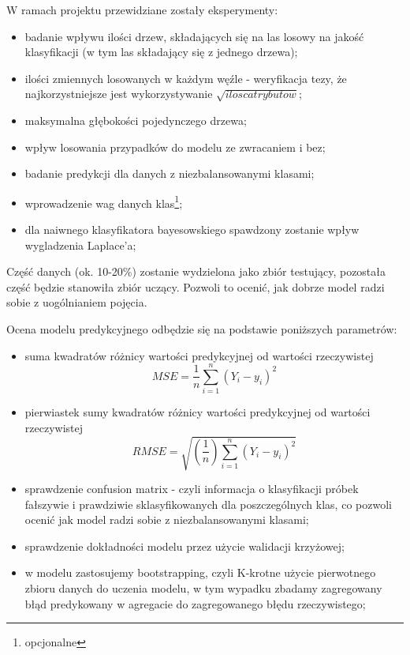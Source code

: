 
W ramach projektu przewidziane zostały eksperymenty:
\begin{itemize}
    \item badanie wpływu ilości drzew, składających się na las losowy na jakość klasyfikacji (w tym las składający się z jednego drzewa);
    \item ilości zmiennych losowanych w każdym węźle - weryfikacja tezy, że najkorzystniejsze jest wykorzystywanie $\sqrt {ilosc atrybutow}$;
    \item maksymalna głębokości pojedynczego drzewa;
    \item wpływ losowania przypadków do modelu ze zwracaniem i bez;
    \item badanie predykcji dla danych z niezbalansowanymi klasami;
        \item wprowadzenie wag danych klas\footnote[*]{opcjonalne};
        \item dla naiwnego klasyfikatora bayesowskiego spawdzony zostanie wpływ wygladzenia Laplace'a;
        
\end{itemize}

Część danych (ok. 10-20\%) zostanie wydzielona jako zbiór testujący, pozostała część będzie stanowiła zbiór uczący. Pozwoli to ocenić, jak dobrze model radzi sobie z uogólnianiem pojęcia. 

Ocena modelu predykcyjnego odbędzie się na podstawie poniższych parametrów:
\begin{itemize}
    \item suma kwadratów różnicy wartości predykcyjnej od wartości rzeczywistej
    \begin{equation}
    MSE = {\frac{1}{n}\sum_{i=1}^{n}(Y_{i} - y_{i})^{2}}
    \end{equation}
    \item pierwiastek sumy kwadratów różnicy wartości predykcyjnej od wartości rzeczywistej
    \begin{equation}
    RMSE = \sqrt{(\frac{1}{n})\sum_{i=1}^{n}(Y_{i} - y_{i})^{2}}
    \end{equation}
    \item sprawdzenie confusion matrix - czyli informacja o klasyfikacji próbek fałszywie i prawdziwie sklasyfikowanych dla poszczególnych klas, co pozwoli ocenić jak model radzi sobie z niezbalansowanymi klasami;
    \item sprawdzenie dokładności modelu przez użycie walidacji krzyżowej;
    \item w modelu zastosujemy bootstrapping, czyli K-krotne użycie pierwotnego zbioru danych do uczenia modelu, w tym wypadku zbadamy zagregowany błąd predykowany w agregacie do zagregowanego błędu rzeczywistego;
\end{itemize}

